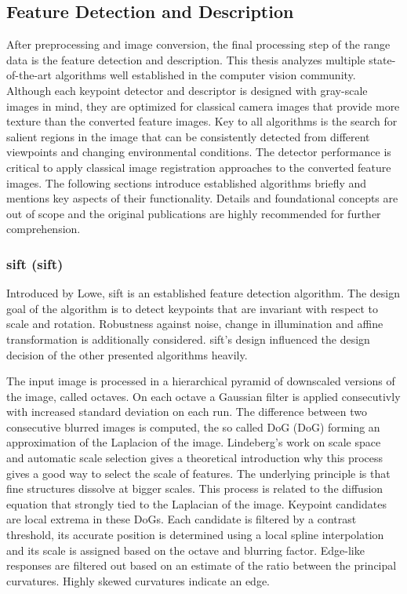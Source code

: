 \subsection{Feature Detection and Description}\label{sec:feature_algorithms}

After preprocessing and image conversion, the final processing step of the range data is the feature detection and description.
This thesis analyzes multiple state-of-the-art algorithms well established in the computer vision community.
Although each keypoint detector and descriptor is designed with gray-scale images in mind, they are optimized for classical camera images that provide more texture than the converted feature images.
Key to all algorithms is the search for salient regions in the image that can be consistently detected from different viewpoints and changing environmental conditions.
The detector performance is critical to apply classical image registration approaches to the converted feature images.
The following sections introduce established algorithms briefly and mentions key aspects of their functionality.
Details and foundational concepts are out of scope and the original publications are highly recommended for further comprehension.

\subsubsection{\acrshort{sift} (\acrlong{sift})}

Introduced by Lowe\cite{lowe_iccv99,lowe_ijcv04}, \acrshort{sift} is an established feature detection algorithm.
The design goal of the algorithm is to detect keypoints that are invariant with respect to scale and rotation.
Robustness against noise, change in illumination and affine transformation is additionally considered.
\acrshort{sift}'s design influenced the design decision of the other presented algorithms heavily.

The input image is processed in a hierarchical pyramid of downscaled versions of the image, called octaves.
On each octave a Gaussian filter is applied consecutivly with increased standard deviation on each run.
The difference between two consecutive blurred images is computed, the so called \acrlong{DoG} (\acrshort{DoG}) forming an approximation of the Laplacion of the image.
Lindeberg's\cite{lindeberg_ijcv98} work on scale space and automatic scale selection gives a theoretical introduction why this process gives a good way to select the scale of features.
The underlying principle is that fine structures dissolve at bigger scales.
This process is related to the diffusion equation that strongly tied to the Laplacian of the image.
Keypoint candidates are local extrema in these \acrshort{DoG}s.
Each candidate is filtered by a contrast threshold, its accurate position is determined using a local spline interpolation and its scale is assigned based on the octave and blurring factor.
Edge-like responses are filtered out based on an estimate of the ratio between the principal curvatures.
Highly skewed curvatures indicate an edge.

